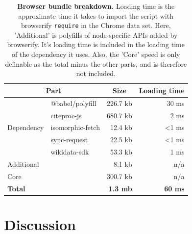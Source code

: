 \documentclass[fleqn,10pt,lineno]{wlpeerj} %
\begin{document}
\begin{table}[ht]
\begin{tabular}{|l|l|r|r|}
\hline
\multicolumn{2}{|c|}{\textbf{Part}}            & \multicolumn{1}{c|}{\textbf{Size}} & \multicolumn{1}{l|}{\textbf{Loading time}} \\ \hline
\multirow{5}{*}{Dependency} & @babel/polyfill  & 226.7 kb                           & 30 ms                                      \\ \cline{2-4} 
                            & citeproc-js      & 680.7 kb                           & 2 ms                                       \\ \cline{2-4} 
                            & isomorphic-fetch & 12.4 kb                            & \textless 1 ms                                    \\ \cline{2-4} 
                            & sync-request     & 22.5 kb                            & \textless 1 ms                                     \\ \cline{2-4} 
                            & wikidata-sdk     & 53.3 kb                            & 1 ms                                       \\ \hline
\multicolumn{2}{|l|}{Additional}               & 8.1 kb                             & n/a                                        \\ \hline
\multicolumn{2}{|l|}{Core}                     & 300.7 kb                           & n/a                                        \\ \hline
\multicolumn{2}{|l|}{\textbf{Total}}           & \textbf{1.3 mb}                    & \textbf{60 ms}                             \\ \hline
\end{tabular}
\caption{\textbf{Browser bundle breakdown.} Loading time is the approximate time it takes to import the script with browserify \texttt{require} in the Chrome data set. Here, 'Additional' is polyfills of node-specific APIs added by browserify. It's loading time is included in the loading time of the dependency it uses. Also, the 'Core' speed is only definable as the total minus the other parts, and is therefore not included.}
\label{table:size}
\end{table}

\section*{Discussion}
\end{document}

